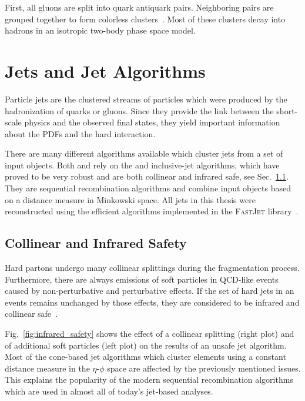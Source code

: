 First, all gluons are split into quark antiquark pairs. Neighboring pairs are
grouped together to form colorless
clusters~\cite{Webber:1983if,Marchesini:1987cf}. Most of these clusters decay
into hadrons in an isotropic two-body phase space model.

\section{Jets and Jet Algorithms}
\label{sec:jet_algorithms}

Particle jets are the clustered streams of particles which were produced by the
hadronization of quarks or gluons. Since they provide the link between the
short-scale physics and the observed final states, they yield important
information about the PDFs and the hard interaction.

There are many different algorithms available which cluster jets
from a set of input objects. Both \CMS and \ATLAS rely on the \antikt and
inclusive-\kt jet algorithms, which have proved to be very robust and are both
collinear and infrared safe, see Sec.~\ref{sec:coll_safety}. They are
sequential recombination algorithms and combine input objects based on a
distance measure in Minkowski space. All jets in this thesis were reconstructed using the
efficient algorithms implemented in the \textsc{FastJet} library~\cite{Cacciari:2011ma}.

\subsection{Collinear and Infrared Safety}
\label{sec:coll_safety}

Hard partons undergo many collinear splittings during the fragmentation process.
Furthermore, there are always emissions of soft particles in QCD-like events
caused by non-perturbative and perturbative effects. If the set of hard jets in an
events remains unchanged by those effects, they are considered to be infrared
and collinear safe~\cite{Salam:2009jx}.

Fig.~\ref{fig:infrared_safety} shows the effect of a collinear splitting (right
plot) and of additional soft particles (left plot) on the results of an unsafe
jet algorithm. Most of the cone-based jet algorithms which cluster elements
using a constant distance measure in the $\eta$-$\phi$ space are affected by the
previously mentioned issues. This explains the popularity of the modern sequential
recombination algorithms which are used in almost all of today's jet-based
analyses.

